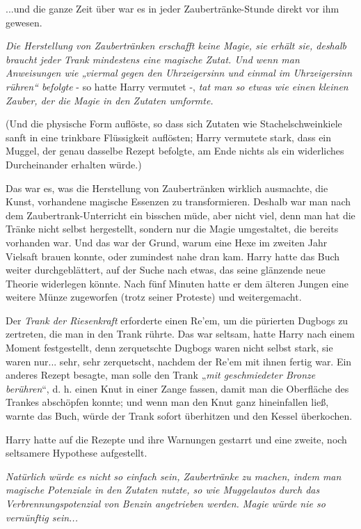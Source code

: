 {...und die ganze Zeit über war es in jeder Zaubertränke-Stunde direkt vor ihm gewesen.

\emph{Die Herstellung von Zaubertränken erschafft keine Magie, sie erhält sie, deshalb braucht jeder Trank mindestens eine magische Zutat. Und wenn man Anweisungen wie „viermal gegen den Uhrzeigersinn und einmal im Uhrzeigersinn rühren“ befolgte} - so hatte Harry vermutet -, \emph{tat man so etwas wie einen kleinen Zauber, der die Magie in den Zutaten umformte.}

(Und die physische Form auflöste, so dass sich Zutaten wie Stachelschweinkiele sanft in eine trinkbare Flüssigkeit auflösten; Harry vermutete stark, dass ein Muggel, der genau dasselbe Rezept befolgte, am Ende nichts als ein widerliches Durcheinander erhalten würde.)

Das war es, was die Herstellung von Zaubertränken wirklich ausmachte, die Kunst, vorhandene magische Essenzen zu transformieren. Deshalb war man nach dem Zaubertrank-Unterricht ein bisschen müde, aber nicht viel, denn man hat die Tränke nicht selbst hergestellt, sondern nur die Magie umgestaltet, die bereits vorhanden war. Und das war der Grund, warum eine Hexe im zweiten Jahr Vielsaft brauen konnte, oder zumindest nahe dran kam. Harry hatte das Buch weiter durchgeblättert, auf der Suche nach etwas, das seine glänzende neue Theorie widerlegen könnte. Nach fünf Minuten hatte er dem älteren Jungen eine weitere Münze zugeworfen (trotz seiner Proteste) und weitergemacht.

Der \emph{Trank der Riesenkraft} erforderte einen Re'em, um die pürierten Dugbogs zu zertreten, die man in den Trank rührte. Das war seltsam, hatte Harry nach einem Moment festgestellt, denn zerquetschte Dugbogs waren nicht selbst stark, sie waren nur... sehr, sehr zerquetscht, nachdem der Re'em mit ihnen fertig war. Ein anderes Rezept besagte, man solle den Trank „\emph{mit geschmiedeter Bronze berühren}“, d. h. einen Knut in einer Zange fassen, damit man die Oberfläche des Trankes abschöpfen konnte; und wenn man den Knut ganz hineinfallen ließ, warnte das Buch, würde der Trank sofort überhitzen und den Kessel überkochen.

Harry hatte auf die Rezepte und ihre Warnungen gestarrt und eine zweite, noch seltsamere Hypothese aufgestellt.

\emph{Natürlich würde es nicht so einfach sein, Zaubertränke zu machen, indem man magische Potenziale in den Zutaten nutzte, so wie Muggelautos durch das Verbrennungspotenzial von Benzin angetrieben werden. Magie würde nie so} \emph{vernünftig sein...}

}
